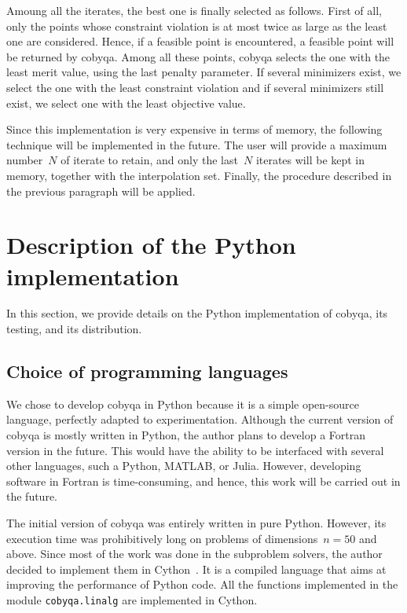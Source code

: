 Amoung all the iterates, the best one is finally selected as follows.
First of all, only the points whose constraint violation is at most twice as large as the least one are considered.
Hence, if a feasible point is encountered, a feasible point will be returned by \gls{cobyqa}.
Among all these points, \gls{cobyqa} selects the one with the least merit value, using the last penalty parameter.
If several minimizers exist, we select the one with the least constraint violation and if several minimizers still exist, we select one with the least objective value.

Since this implementation is very expensive in terms of memory, the following technique will be implemented in the future.
The user will provide a maximum number~$N$ of iterate to retain, and only the last~$N$ iterates will be kept in memory, together with the interpolation set.
Finally, the procedure described in the previous paragraph will be applied.

\section{Description of the Python implementation}
\label{sec:python-implementation}

In this section, we provide details on the Python implementation of \gls{cobyqa}, its testing, and its distribution.

\subsection{Choice of programming languages}

We chose to develop \gls{cobyqa} in Python because it is a simple open-source language, perfectly adapted to experimentation.
Although the current version of \gls{cobyqa} is mostly written in Python, the author plans to develop a Fortran version in the future.
This would have the ability to be interfaced with several other languages, such a Python, MATLAB, or Julia.
However, developing software in Fortran is time-consuming, and hence, this work will be carried out in the future.

The initial version of \gls{cobyqa} was entirely written in pure Python.
However, its execution time was prohibitively long on problems of dimensions~$n = 50$ and above.
Since most of the work was done in the subproblem solvers, the author decided to implement them in Cython~\cite{Behnel_Etal_2011}.
It is a compiled language that aims at improving the performance of Python code.
All the functions implemented in the module \texttt{cobyqa.linalg} are implemented in Cython.

